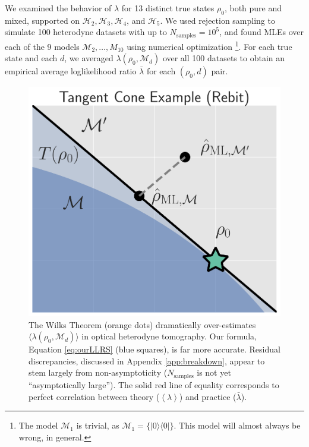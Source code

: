 \documentclass[aps,pra, twocolumn]{revtex4}
\newcommand{\M}{\mathcal{M}}
\newcommand{\expect}[1]{\ensuremath{\left\langle#1\right\rangle}}
\begin{document}
We examined the behavior of $\lambda$ for 13 distinct true states $\rho_{0}$, both pure and mixed, supported on $\mathcal{H}_{2}, \mathcal{H}_{3}, \mathcal{H}
_{4}$, and $\mathcal{H}_{5}$.  We used rejection sampling to simulate 100 heterodyne datasets with up to $N_{\mathrm{samples}}=10^5$, and found MLEs over each of the 9 models $\M_2, \ldots, M_{10}$ using numerical optimization \footnote{The model $\M_{1}$ is trivial, as $\M_{1} = \{|0\rangle \langle 0|\}$. This model will almost always be wrong, in general.}.  For each true state and each $d$, we averaged $\lambda(\rho_{0}, \M_{d})$ over all 100 datasets to obtain an empirical average loglikelihood ratio $\bar{\lambda}$ for each $(\rho_0,d)$ pair.

\begin{figure}[h]
 \includegraphics[width=\columnwidth]{Images/Figure_4.pdf}
 \caption{The Wilks Theorem (orange dots) dramatically over-estimates $\langle\lambda(\rho_{0}, \M_{d})\rangle$ in optical heterodyne tomography. Our formula, Equation \ref{eq:ourLLRS} (blue squares), is far more accurate. Residual discrepancies, discussed in Appendix \ref{app:breakdown}, appear to stem largely from non-asymptoticity ($N_{\mathrm{samples}}$ is not yet ``asymptotically large''). The solid red line of equality corresponds to perfect correlation between theory ($\expect{\lambda}$) and practice ($\bar\lambda$).}
 \label{fig:modelcomp}
\end{figure}
\end{document}
